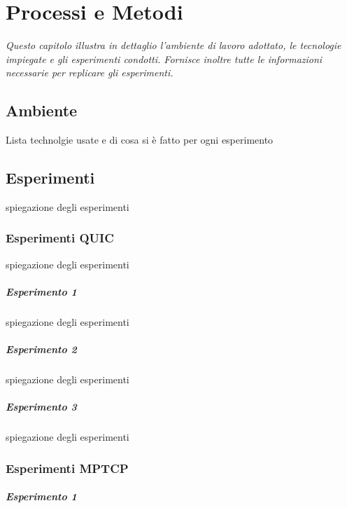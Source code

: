 \chapter{Processi e Metodi}
\label{cap:processi-metodologie}

\textit{\indent Questo capitolo illustra in dettaglio l'ambiente di lavoro adottato, le tecnologie impiegate e gli esperimenti condotti. 
Fornisce inoltre tutte le informazioni necessarie per replicare gli esperimenti.}

\section{Ambiente}

Lista technolgie usate e di cosa si è fatto per ogni esperimento

\section{Esperimenti}

spiegazione degli esperimenti

\subsection{Esperimenti QUIC}

spiegazione degli esperimenti

\paragraph{Esperimento 1}
spiegazione degli esperimenti
\paragraph{Esperimento 2}
spiegazione degli esperimenti
\paragraph{Esperimento 3}
spiegazione degli esperimenti

\subsection{Esperimenti MPTCP}
\paragraph{Esperimento 1}

